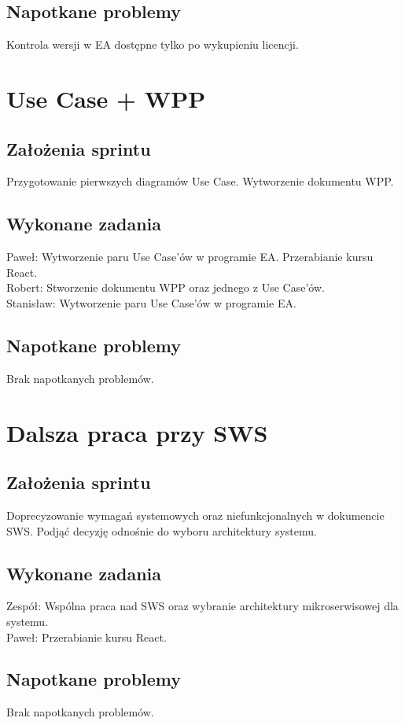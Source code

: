 \documentclass[a4paper,11pt]{report}
\begin{document}
\subsection {Napotkane problemy} 
Kontrola wersji w EA dostępne tylko po wykupieniu licencji.

\section {Use Case + WPP}
\subsection {Założenia sprintu}
Przygotowanie pierwszych diagramów Use Case. Wytworzenie dokumentu WPP.
\subsection {Wykonane zadania}
Paweł: Wytworzenie paru Use Case'ów w programie EA. Przerabianie kursu React.\\
Robert: Stworzenie dokumentu WPP oraz jednego z Use Case'ów.\\
Stanisław: Wytworzenie paru Use Case'ów w programie EA.\\
\subsection {Napotkane problemy}
Brak napotkanych problemów.

\section {Dalsza praca przy SWS}
\subsection {Założenia sprintu}
Doprecyzowanie wymagań systemowych oraz niefunkcjonalnych w dokumencie SWS. Podjąć decyzję odnośnie do wyboru architektury systemu.
\subsection {Wykonane zadania}
Zespół: Wspólna praca nad SWS oraz wybranie architektury mikroserwisowej dla systemu.\\
Paweł: Przerabianie kursu React.\\
\subsection {Napotkane problemy}
Brak napotkanych problemów.
\end{document}
